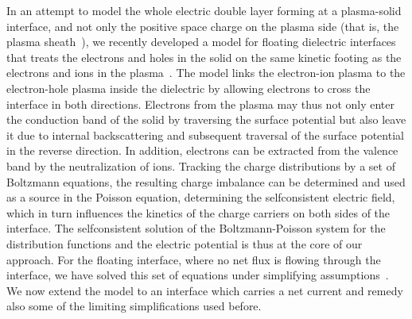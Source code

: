 \documentclass[pre,reprint,floats]{revtex4-1}
\begin{document}
In an attempt to model the whole electric double layer forming at a plasma-solid 
interface, and not only the positive space charge on the plasma side (that is, the plasma
sheath~\cite{SB90,Riemann91,Franklin03,Brinkmann09,Robertson13}), we recently developed a model for 
floating dielectric interfaces that treats the electrons and holes in the solid on the same kinetic 
footing as the electrons and ions in the plasma~\cite{RBF20,BF17}. The model links the electron-ion 
plasma to the electron-hole plasma inside the dielectric by allowing electrons to cross the interface 
in both directions. Electrons from the plasma may thus not only enter the conduction band of the solid 
by traversing the surface potential but also leave it due to internal backscattering and subsequent 
traversal of the surface potential in the reverse direction. In addition, electrons can be 
extracted from the valence band by the neutralization of ions. Tracking the charge distributions
by a set of Boltzmann equations, the resulting charge imbalance can be determined and used as a 
source in the Poisson equation, determining the selfconsistent electric field, which in turn 
influences the kinetics of the charge carriers on both sides of the interface. 
The selfconsistent solution of the Boltzmann-Poisson system for the distribution functions and the
electric potential is thus at the core of our approach. For the floating interface, where no net 
flux is flowing through the interface, we have solved this set of equations under simplifying 
assumptions~\cite{RBF20}. We now extend the model to an interface which carries a net current and 
remedy also some of the limiting simplifications used before. 
	
\end{document}
